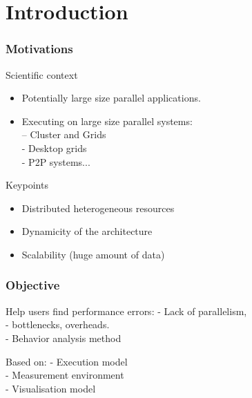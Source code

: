 \section{Introduction}

\frame
{
  \frametitle{Motivations}
\begin{block}{Scientific context}
\begin{itemize}
\item Potentially large size parallel applications.
\item Executing on large size parallel systems:\\
– Cluster and Grids \\
- Desktop grids\\
- P2P systems...
\end{itemize}
\end{block}
\begin{block}{Keypoints}
\begin{itemize}
\item Distributed heterogeneous resources
\item Dynamicity of the architecture
\item Scalability (huge amount of data)
\end{itemize}
\end{block}
}
\begin{frame}
\frametitle{Objective}
\begin{block}{Help users find performance errors:}
- Lack of parallelism, \\
- bottlenecks, overheads.\\
- Behavior analysis method
\end{block}
\begin{block}{Based on:}
- Execution model\\
- Measurement environment\\
- Visualisation model
\end{block}
\end{frame}
